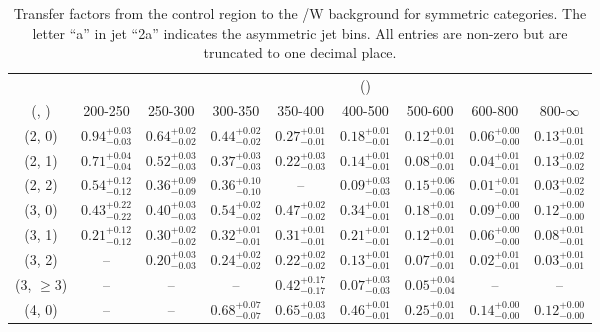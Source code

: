 \begin{table}[h!]
\tiny
\centering
\caption{Transfer factors from the \mj control region to the \ttbar/W background for symmetric categories. The letter ``a'' in jet \eg ``2a''  indicates the asymmetric jet bins. All entries are non-zero but are truncated to one decimal place.\label{tab:tf_mu_ttw_sym}}
\begin{tabular}
{ccccccccc}
	\hline\hline
&	& \multicolumn{8}{c}{\scalht (\gev)} \\ 
	 (\njet,  \nb) & 200-250 & 250-300 & 300-350 & 350-400 & 400-500 & 500-600 & 600-800 & 800-$\infty$ \\ [0.8ex] 
\hline
	(2, 0) & $0.94^{+ 0.03 }_{- 0.03 }$ & $0.64^{+ 0.02 }_{- 0.02 }$ & $0.44^{+ 0.02 }_{- 0.02 }$ & $0.27^{+ 0.01 }_{- 0.01 }$ & $0.18^{+ 0.01 }_{- 0.01 }$ & $0.12^{+ 0.01 }_{- 0.01 }$ & $0.06^{+ 0.00 }_{- 0.00 }$ & $0.13^{+ 0.01 }_{- 0.01 }$ \\[0.5ex] 
	(2, 1) & $0.71^{+ 0.04 }_{- 0.04 }$ & $0.52^{+ 0.03 }_{- 0.03 }$ & $0.37^{+ 0.03 }_{- 0.03 }$ & $0.22^{+ 0.03 }_{- 0.03 }$ & $0.14^{+ 0.01 }_{- 0.01 }$ & $0.08^{+ 0.01 }_{- 0.01 }$ & $0.04^{+ 0.01 }_{- 0.01 }$ & $0.13^{+ 0.02 }_{- 0.02 }$ \\[0.5ex] 
	(2, 2) & $0.54^{+ 0.12 }_{- 0.12 }$ & $0.36^{+ 0.09 }_{- 0.09 }$ & $0.36^{+ 0.10 }_{- 0.10 }$ & -- & $0.09^{+ 0.03 }_{- 0.03 }$ & $0.15^{+ 0.06 }_{- 0.06 }$ & $0.01^{+ 0.01 }_{- 0.01 }$ & $0.03^{+ 0.02 }_{- 0.02 }$ \\[0.5ex] 
	(3, 0) & $0.43^{+ 0.22 }_{- 0.22 }$ & $0.40^{+ 0.03 }_{- 0.03 }$ & $0.54^{+ 0.02 }_{- 0.02 }$ & $0.47^{+ 0.02 }_{- 0.02 }$ & $0.34^{+ 0.01 }_{- 0.01 }$ & $0.18^{+ 0.01 }_{- 0.01 }$ & $0.09^{+ 0.00 }_{- 0.00 }$ & $0.12^{+ 0.00 }_{- 0.00 }$ \\[0.5ex] 
	(3, 1) & $0.21^{+ 0.12 }_{- 0.12 }$ & $0.30^{+ 0.02 }_{- 0.02 }$ & $0.32^{+ 0.01 }_{- 0.01 }$ & $0.31^{+ 0.01 }_{- 0.01 }$ & $0.21^{+ 0.01 }_{- 0.01 }$ & $0.12^{+ 0.01 }_{- 0.01 }$ & $0.06^{+ 0.00 }_{- 0.00 }$ & $0.08^{+ 0.01 }_{- 0.01 }$ \\[0.5ex] 
	(3, 2) & -- & $0.20^{+ 0.03 }_{- 0.03 }$ & $0.24^{+ 0.02 }_{- 0.02 }$ & $0.22^{+ 0.02 }_{- 0.02 }$ & $0.13^{+ 0.01 }_{- 0.01 }$ & $0.07^{+ 0.01 }_{- 0.01 }$ & $0.02^{+ 0.01 }_{- 0.01 }$ & $0.03^{+ 0.01 }_{- 0.01 }$ \\[0.5ex] 
	(3, $\ge3$) & -- & -- & -- & $0.42^{+ 0.17 }_{- 0.17 }$ & $0.07^{+ 0.03 }_{- 0.03 }$ & $0.05^{+ 0.04 }_{- 0.04 }$ & -- & -- \\[0.5ex] 
	(4, 0) & -- & -- & $0.68^{+ 0.07 }_{- 0.07 }$ & $0.65^{+ 0.03 }_{- 0.03 }$ & $0.46^{+ 0.01 }_{- 0.01 }$ & $0.25^{+ 0.01 }_{- 0.01 }$ & $0.14^{+ 0.00 }_{- 0.00 }$ & $0.12^{+ 0.00 }_{- 0.00 }$ \\[0.5ex] 

\end{tabular}
\end{table}
